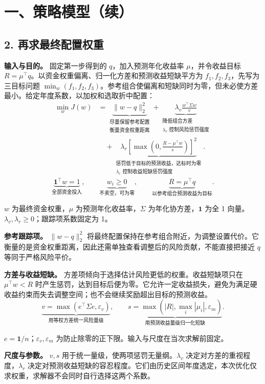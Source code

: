 \documentclass[UTF8,zihao=-4]{ctexart}
\newcommand{\note}[1]{{\small\color{softgray}#1\par}}
\begin{document}
\clearpage
\section*{一、策略模型（续）}
\subsection*{2. 再求最终配置权重}
\textbf{输入与目的。} 固定第一步得到的 $q$，加入预测年化收益率 $\mu$，并令收益目标 $R=\mu^\top q$。以资金权重偏离、归一化方差和预测收益短缺平方为 $f_1,f_2,f_3$，先写为三目标问题 $\min_w(f_1,f_2,f_3)$。参考组合使偏离和短缺同时为零，但未必使方差最小。给定年度系数，以加权和选取折中配置：
\begin{align*}
 \min_w J(w)
 &=\underbrace{\|w-q\|_2^2}_{\substack{\text{尽量保留参考配置}\\\text{衡量资金权重距离}}}
 +\underbrace{\lambda_v\frac{w^\top\Sigma w}{v}}_{\substack{\text{降低组合方差}\\\lambda_v\text{ 控制风险惩罚强度}}}\\[0.3em]
 &\quad+\underbrace{\lambda_r\left[\max\left(0,\frac{R-\mu^\top w}{s}\right)\right]^2}_{\substack{\text{惩罚低于目标的预测收益，达标时为零}\\\lambda_r\text{ 控制收益短缺惩罚强度}}}.
\end{align*}
\[
 \underbrace{\mathbf1^\top w=1}_{\text{全部资金投入}},\qquad
 \underbrace{w_i\ge0}_{\text{不卖空，可为零}},\qquad
 \underbrace{R=\mu^\top q}_{\text{以参考组合预测收益为目标}}.
\]
\note{$w$ 为最终资金权重，$\mu$ 为预测年化收益率，$\Sigma$ 为年化协方差，$\mathbf1$ 为全 1 向量。$\lambda_v,\lambda_r\ge0$；跟踪项系数固定为 1。}
\textbf{参考跟踪项。} $\|w-q\|_2^2$ 将最终配置保持在参考组合附近，为调整设置代价。它衡量的是资金权重距离，因此还需单独查看调整后的风险贡献，不能直接把接近 $q$ 等同于严格风险平价。

\textbf{方差与收益短缺。} 方差项倾向于选择估计风险更低的权重。收益短缺项只在 $\mu^\top w<R$ 时产生惩罚，达到目标后便为零。它允许一定收益损失，避免为满足硬收益约束而失去调整空间；也不会继续奖励超出目标的预测收益。
\[
 \underbrace{v=\max(e^\top\Sigma e,\varepsilon_v)}_{\text{用等权方差统一风险量级}},\qquad
 \underbrace{s=\max(|R|,\max_i|\mu_i|,\varepsilon_m)}_{\text{用预测收益量级归一化短缺}}.
\]
\note{$e=\mathbf1/n$；$\varepsilon_v,\varepsilon_m$ 为防止除零的正下限。输入与尺度在当次求解前固定。}
\textbf{尺度与参数。} $v,s$ 用于统一量级，使两项惩罚无量纲。$\lambda_v$ 决定对方差的重视程度，$\lambda_r$ 决定对预测收益短缺的容忍程度。它们由历史区间年度选定，本次优化仅求权重，求解器不会同时自行选择这两个系数。
\end{document}
